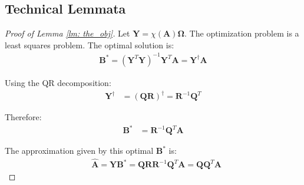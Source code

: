 \documentclass[conference]{IEEEtran}
\newtheorem{lemma}{Lemma}
\begin{document}
\subsection{Technical Lemmata}
\begin{proof}[Proof of Lemma \ref{lm: the_obj}]Let $\mathbf{Y} = \chi(\mathbf{A})\boldsymbol{\Omega}$. 
The optimization problem is a least squares problem. The optimal solution is:
\begin{align*}
   \mathbf{B}^* = (\mathbf{Y}^T\mathbf{Y})^{-1}\mathbf{Y}^T\mathbf{A} = \mathbf{Y}^{\dagger}\mathbf{A} \nonumber
\end{align*}

Using the QR decomposition:
\begin{align*}
   \mathbf{Y}^{\dagger} &= (\mathbf{Q}\mathbf{R})^{\dagger} = \mathbf{R}^{-1}\mathbf{Q}^T
\end{align*}

Therefore:
\begin{align*}
   \mathbf{B}^* &= \mathbf{R}^{-1}\mathbf{Q}^T\mathbf{A}
\end{align*}

The approximation given by this optimal $\mathbf{B}^*$ is:
\begin{align*}
   & \hat{\mathbf{A}} = \mathbf{Y}\mathbf{B}^* 
   = \mathbf{Q}\mathbf{R} \mathbf{R}^{-1}\mathbf{Q}^T\mathbf{A} = \mathbf{Q}\mathbf{Q}^T\mathbf{A} \nonumber
\end{align*}

\end{proof}





\end{document}
